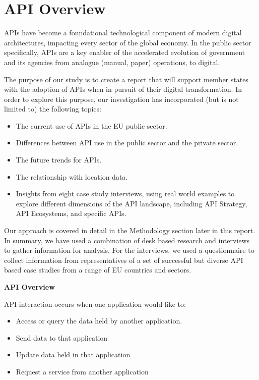 \section{API Overview} %


APIs have become a foundational technological component of modern digital
architectures, impacting every sector of the global economy. In the public
sector specifically, APIs are a key enabler of the accelerated evolution
of government and its agencies from analogue (manual, paper) operations,
to digital. 

The purpose of our study is to create a report that will support member
states with the adoption of APIs when in pursuit of their digital
transformation. In order to explore this purpose, our investigation has
incorporated (but is not limited to) the following topics:

\begin{itemize}
	\item The current use of APIs in the EU public sector.
	\item Differences between API use in the public sector and the private sector.
	\item The future trends for APIs.
	\item The relationship with location data.
	\item Insights from eight case study interviews, using real world examples
	to explore different dimensions of the API landscape, including API Strategy,
	API Ecosystems, and specific APIs.
\end{itemize}

Our approach is covered in detail in the Methodology section later in this report.
In summary, we have used a combination of desk based research and interviews to
gather information for analysis. For the interviews, we used a questionnaire to
collect information from representatives of a set of successful but diverse API
based case studies from a range of EU countries and sectors.

\textbf{API Overview}

API interaction occurs when one application would like to:
\begin{itemize}
	\item Access or query the data held by another application.
	\item Send data to that application
	\item Update data held in that application
	\item Request a service from another application
\end{itemize}

